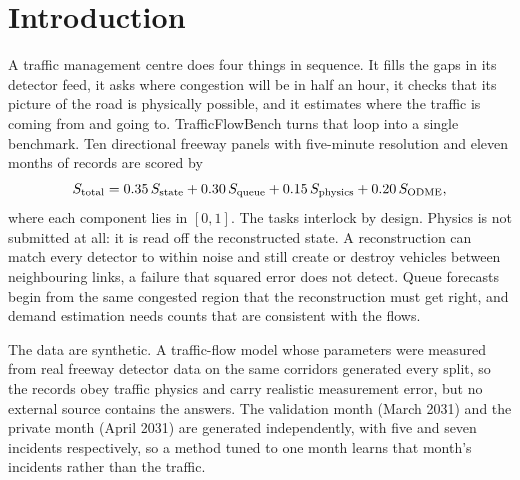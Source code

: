 \section{Introduction}\label{sec:intro}

A traffic management centre does four things in sequence. It fills the gaps in its detector feed, it asks
where congestion will be in half an hour, it checks that its picture of the road is physically possible,
and it estimates where the traffic is coming from and going to. TrafficFlowBench \cite{tfb2026} turns that
loop into a single benchmark. Ten directional freeway panels with five-minute resolution and eleven months of
records are scored by
\begin{equation}
  S_{\mathrm{total}} = 0.35\,S_{\mathrm{state}} + 0.30\,S_{\mathrm{queue}} + 0.15\,S_{\mathrm{physics}} + 0.20\,S_{\mathrm{ODME}} ,
  \label{eq:total}
\end{equation}
where each component lies in $[0,1]$. The tasks interlock by design. Physics is not submitted at all: it is read
off the reconstructed state. A reconstruction can match every detector to within noise and still create or
destroy vehicles between neighbouring links, a failure that squared error does not detect. Queue forecasts begin
from the same congested region that the reconstruction must get right, and demand estimation needs counts that
are consistent with the flows.

The data are synthetic. A traffic-flow model whose parameters were measured from real freeway detector data
on the same corridors generated every split, so the records obey traffic physics and carry realistic
measurement error, but no external source contains the answers. The validation month (March 2031) and the private
month (April 2031) are generated independently, with five and seven incidents respectively, so a method tuned to
one month learns that month's incidents rather than the traffic.

